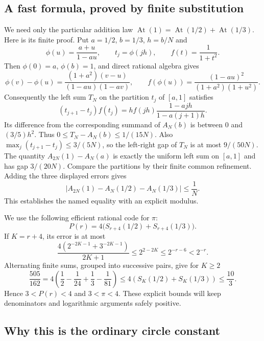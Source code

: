 \documentclass[11pt]{article}
\theoremstyle{definition}
\newcommand{\abs}[1]{\left|#1\right|}
\newcommand{\At}{\operatorname{At}}
\begin{document}
\subsection{A fast formula, proved by finite substitution}

We need only the particular addition law
$\At(1)=\At(1/2)+\At(1/3)$. Here is its finite proof. Put
$a=1/2$, $b=1/3$, $h=b/N$ and
\[
 \phi(u)=\frac{a+u}{1-au},\qquad t_j=\phi(jh),\qquad
 f(t)=\frac1{1+t^2}.
\]
Then $\phi(0)=a$, $\phi(b)=1$, and direct rational algebra gives
\[
 \phi(v)-\phi(u)=\frac{(1+a^2)(v-u)}{(1-au)(1-av)},\qquad
 f(\phi(u))=\frac{(1-au)^2}{(1+a^2)(1+u^2)}.
\]
Consequently the left sum $T_N$ on the partition $t_j$ of $[a,1]$
satisfies
\[
 (t_{j+1}-t_j)f(t_j)
 =h f(jh)\frac{1-ajh}{1-a(j+1)h}.
\]
Its difference from the corresponding summand of $A_N(b)$ is between
$0$ and $(3/5)h^2$. Thus $0\le T_N-A_N(b)\le1/(15N)$.
Also $\max_j(t_{j+1}-t_j)\le3/(5N)$, so the left-right gap of
$T_N$ is at most $9/(50N)$. The quantity
$A_{2N}(1)-A_N(a)$ is exactly the uniform left sum on $[a,1]$ and
has gap $3/(20N)$. Compare the partitions by their finite common
refinement. Adding the three displayed errors gives
\begin{equation}\label{eq:atanaddfinite}
 \abs{A_{2N}(1)-A_N(1/2)-A_N(1/3)}\le\frac1N.
\end{equation}
This establishes the named equality with an explicit modulus.

We use the following efficient rational code for $\pi$:
\begin{equation}\label{eq:Pi}
 P(r)=4\bigl(S_{r+4}(1/2)+S_{r+4}(1/3)\bigr).
\end{equation}
If $K=r+4$, its error is at most
\begin{equation}\label{eq:Pierr}
 \frac{4(2^{-2K-1}+3^{-2K-1})}{2K+1}
 \le2^{2-2K}\le2^{-r-6}<2^{-r}.
\end{equation}
Alternating finite sums, grouped into successive pairs, give for $K\ge2$
\[
 \frac{505}{162}
 =4\left(\frac12-\frac1{24}+\frac13-\frac1{81}\right)
 \le4(S_K(1/2)+S_K(1/3))\le\frac{10}{3}.
\]
Hence $3<P(r)<4$ and $3<\pi<4$. These explicit bounds will keep
denominators and logarithmic arguments safely positive.

\subsection{Why this is the ordinary circle constant}
\label{sec:circle}
\end{document}
